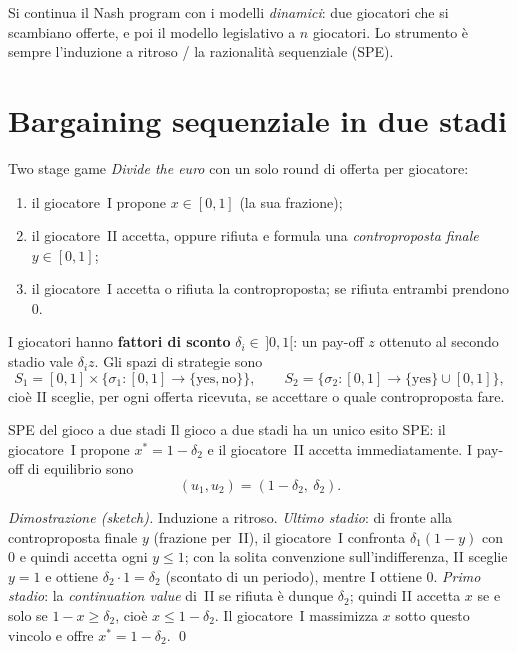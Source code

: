 \documentclass[12pt,a4paper,twoside]{book}
\theoremstyle{plain}
\theoremstyle{definition}
\begin{document}
Si continua il Nash program con i modelli \emph{dinamici}: due giocatori che si scambiano
offerte, e poi il modello legislativo a $n$ giocatori. Lo strumento è sempre l'induzione a
ritroso / la razionalità sequenziale (SPE).

\section{Bargaining sequenziale in due stadi}

\begin{defbox}{Two stage game}
\emph{Divide the euro} con un solo round di offerta per giocatore:
\begin{enumerate}
  \item il giocatore~I propone $x\in[0,1]$ (la sua frazione);
  \item il giocatore~II accetta, oppure rifiuta e formula una \emph{controproposta finale}
        $y\in[0,1]$;
  \item il giocatore~I accetta o rifiuta la controproposta; se rifiuta entrambi prendono $0$.
\end{enumerate}
I giocatori hanno \textbf{fattori di sconto} $\delta_i\in\,]0,1[$: un pay-off $z$ ottenuto al
secondo stadio vale $\delta_i z$. Gli spazi di strategie sono
\[
  S_1=[0,1]\times\{\sigma_1:[0,1]\to\{\text{yes},\text{no}\}\},\qquad
  S_2=\{\sigma_2:[0,1]\to\{\text{yes}\}\cup[0,1]\},
\]
cioè II sceglie, per ogni offerta ricevuta, se accettare o quale controproposta fare.
\end{defbox}

\begin{thmbox}{SPE del gioco a due stadi}
Il gioco a due stadi ha un unico esito SPE: il giocatore~I propone
$x^*=1-\delta_2$ e il giocatore~II accetta immediatamente. I pay-off di equilibrio sono
\[
  (u_1,u_2)=(1-\delta_2,\ \delta_2).
\]
\end{thmbox}

\textit{Dimostrazione (sketch).} Induzione a ritroso.
\emph{Ultimo stadio}: di fronte alla controproposta finale $y$ (frazione per~II), il
giocatore~I confronta $\delta_1(1-y)$ con $0$ e quindi accetta ogni $y\le1$; con la solita
convenzione sull'indifferenza, II sceglie $y=1$ e ottiene $\delta_2\cdot1=\delta_2$
(scontato di un periodo), mentre I ottiene $0$.
\emph{Primo stadio}: la \emph{continuation value} di~II se rifiuta è dunque $\delta_2$;
quindi II accetta $x$ se e solo se $1-x\ge\delta_2$, cioè $x\le1-\delta_2$. Il giocatore~I
massimizza $x$ sotto questo vincolo e offre $x^*=1-\delta_2$. \qed
\end{document}
